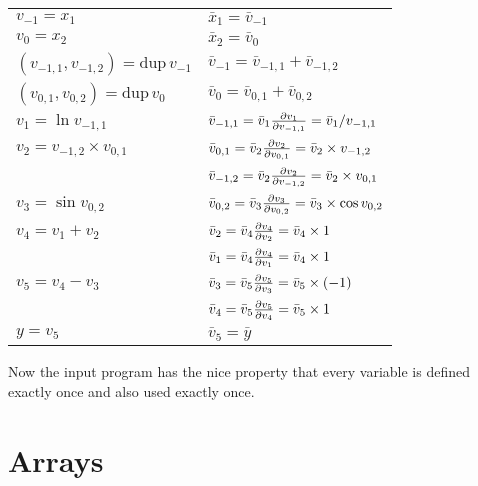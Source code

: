 \documentclass[12pt]{article}
\newcommand{\dup}{\mathrm{dup}}
\begin{document}
\begin{tabular}[t]{ll}

  $v_{-1} = x_1$
  &
  $\bar{x}_1 = \bar{v}_{-1}$
  \\
  
  $v_{0} = x_2$
  &
  $\bar{x}_2 = \bar{v}_{0}$
  \\

  \((v_{-1,1}, v_{-1,2}) = \dup \, v_{-1}\)
  &
  \(\bar{v}_{-1} = \bar{v}_{-1,1} + \bar{v}_{-1,2}\)
  \\

  \((v_{0,1}, v_{0,2}) = \dup \, v_0\)
  &
  \(\bar{v}_{0} = \bar{v}_{0,1} + \bar{v}_{0,2}\)
  \\

  $v_1 = \ln{v_{-1,1}}$
  &
  \(\bar{v}_{-1,1}
  = \bar{v}_{1} \frac{\partial v_{1}}{\partial v_{-1,1}}
  = \bar{v}_1 / v_{-1,1}
  \) \\

  $v_2 = v_{-1,2} \times v_{0,1}$
  &
  \(\bar{v}_{0,1}
  = \bar{v}_{2} \frac{\partial v_{2}}{\partial v_{0,1}}
  = \bar{v}_2 \times v_{-1,2}
  \) \\

  &
  \(\bar{v}_{-1,2}
  = \bar{v}_{2} \frac{\partial v_{2}}{\partial v_{-1,2}}
  = \bar{v}_2 \times v_{0,1}
  \) \\

  $v_3 = \sin{v_{0,2}}$
  &
  \(\bar{v}_{0,2}
  = \bar{v}_{3} \frac{\partial v_{3}}{\partial v_{0,2}}
  = \bar{v}_3 \times \cos v_{0,2}
  \) \\

  $v_4 = v_1 + v_2$
  &
  \(\bar{v}_2
  = \bar{v}_{4} \frac{\partial v_{4}}{\partial v_{2}}
  = \bar{v}_4 \times 1
  \) \\

  &
  \(\bar{v}_1
  = \bar{v}_{4} \frac{\partial v_{4}}{\partial v_{1}}
  = \bar{v}_4 \times 1
  \) \\

  $v_5 = v_4 - v_3$
  &
  \(\bar{v}_3
  = \bar{v}_{5} \frac{\partial v_{5}}{\partial v_{3}}
  = \bar{v}_5 \times (-1)
  \) \\
  
  &
  \(\bar{v}_4
  = \bar{v}_{5} \frac{\partial v_{5}}{\partial v_{4}}
  = \bar{v}_5 \times 1
  \) \\
  
  $y = v_5$
  &
  $\bar{v}_5 = \bar{y}$
  \\

\end{tabular}

Now the input program has the nice property that every variable is
defined exactly once and also used exactly once.

\section{Arrays}
\end{document}
